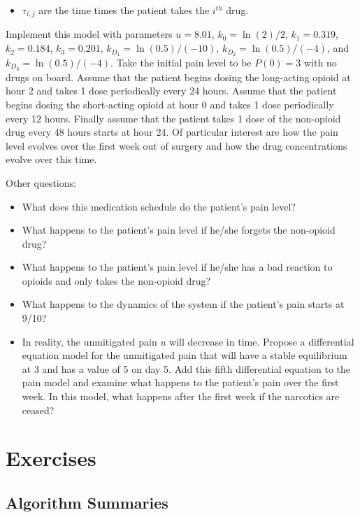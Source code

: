 \begin{problem}
\begin{itemize}
        \item $\tau_{i,j}$ are the time times the patient takes the $i^{th}$ drug.
    \end{itemize}
    Implement this model with parameters
    $u=8.01$, $k_0 = \ln(2)/2$, $k_1 = 0.319$, $k_2 = 0.184$, $k_3 = 0.201$, $k_{D_1} =
    \ln(0.5)/(-10)$, $k_{D_2} = \ln(0.5)/(-4)$, and $k_{D_3} = \ln(0.5)/(-4)$.  Take the
    initial pain level to be $P(0) = 3$ with no drugs on board.  Assume that the patient
    begins dosing the long-acting opioid at hour 2 and takes 1 dose periodically every 24 hours.
    Assume that the patient begins dosing the short-acting opioid at hour 0 and takes 1 dose
    periodically every 12 hours.  Finally assume that the patient takes 1 dose of the non-opioid
    drug every 48 hours starts at hour 24.  Of particular interest are how the pain level
    evolves over the first week out of surgery and how the drug concentrations evolve
    over this time.  
    
    \noindent Other questions:
    \begin{itemize}
        \item What does this medication schedule do the patient's pain level?
        \item What happens to the patient's pain level if he/she forgets the non-opioid
            drug?
        \item What happens to the patient's pain level if he/she has a bad reaction to
            opioids and only takes the non-opioid drug?
        \item What happens to the dynamics of the system if the patient's pain starts at
            9/10?
        \item In reality, the unmitigated pain $u$ will decrease in time.  Propose a
            differential equation model for the unmitigated pain that will have a stable
            equilibrium at 3 and has a value of 5 on day 5. Add this fifth differential
            equation to the pain model and examine what happens to the patient's pain
            over the first week. In this model, what happens after the first week if the
            narcotics are ceased?
    \end{itemize}
\end{problem}


\newpage\section{Exercises}

\subsection{Algorithm Summaries}

